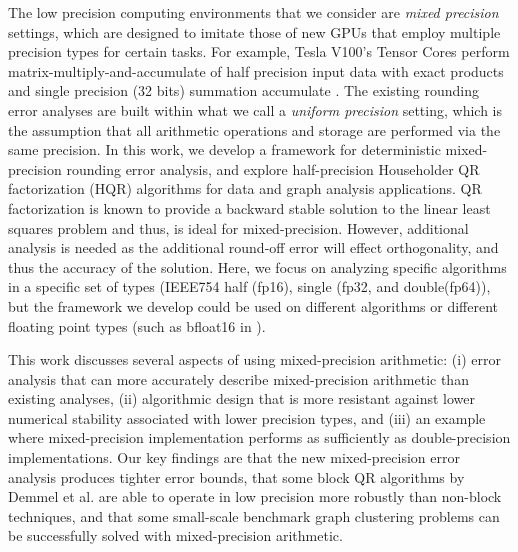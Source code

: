 The low precision computing environments that we consider are \emph{mixed precision} settings, which are designed to imitate those of new GPUs that employ multiple precision types for certain tasks. 
For example, Tesla V100's Tensor Cores perform matrix-multiply-and-accumulate of half precision input data with exact products and single precision (32 bits) summation accumulate \cite{nvdia}.
The existing rounding error analyses are built within what we call a \emph{uniform precision} setting, which is the assumption that all arithmetic operations and storage are performed via the same precision.
In this work, we develop a framework for deterministic mixed-precision rounding error analysis, and explore half-precision Householder QR factorization (HQR) algorithms for data and graph analysis applications. 
QR factorization is known to provide a backward stable solution to the linear least squares problem and thus, is ideal for mixed-precision. 
However, additional analysis is needed as the additional round-off error will effect orthogonality, and thus the accuracy of the solution. 
Here, we focus on analyzing specific algorithms in a specific set of types (IEEE754 half (fp16), single (fp32, and double(fp64)), but the framework we develop 
could be used on different algorithms or different floating point types (such as bfloat16 in \cite{tagliavini2018floating}).\par

This work discusses several aspects of using mixed-precision arithmetic: (i) error analysis that can more accurately describe mixed-precision arithmetic than existing analyses, (ii) algorithmic design that is more resistant against lower numerical stability associated with lower precision types, and (iii) an example where mixed-precision implementation performs as sufficiently as double-precision implementations. 
Our key findings are that the new mixed-precision error analysis produces tighter error bounds, that some block QR algorithms by Demmel et al. \cite{Demmel2012} are able to operate in low precision more robustly than non-block techniques, and that some small-scale benchmark graph clustering problems can be successfully solved with mixed-precision arithmetic.
